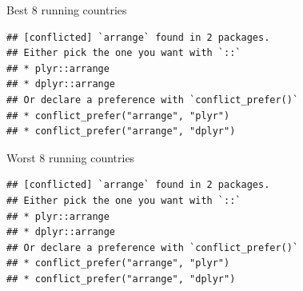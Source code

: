 \documentclass[ignorenonframetext,]{beamer}
\newenvironment{Shaded}{\begin{snugshade}}{\end{snugshade}}
\newcommand{\DataTypeTok}[1]{\textcolor[rgb]{0.13,0.29,0.53}{#1}}
\newcommand{\DecValTok}[1]{\textcolor[rgb]{0.00,0.00,0.81}{#1}}
\newcommand{\FloatTok}[1]{\textcolor[rgb]{0.00,0.00,0.81}{#1}}
\newcommand{\KeywordTok}[1]{\textcolor[rgb]{0.13,0.29,0.53}{\textbf{#1}}}
\newcommand{\NormalTok}[1]{#1}
\newcommand{\OperatorTok}[1]{\textcolor[rgb]{0.81,0.36,0.00}{\textbf{#1}}}
\newcommand{\StringTok}[1]{\textcolor[rgb]{0.31,0.60,0.02}{#1}}
\begin{document}
\begin{frame}[fragile]{Best 8 running countries}
\protect\hypertarget{best-8-running-countries}{}

\begin{Shaded}
\end{Shaded}

\begin{verbatim}
## [conflicted] `arrange` found in 2 packages.
## Either pick the one you want with `::` 
## * plyr::arrange
## * dplyr::arrange
## Or declare a preference with `conflict_prefer()`
## * conflict_prefer("arrange", "plyr")
## * conflict_prefer("arrange", "dplyr")
\end{verbatim}

\end{frame}

\begin{frame}[fragile]{Worst 8 running countries}
\protect\hypertarget{worst-8-running-countries}{}

\begin{Shaded}
\end{Shaded}

\begin{verbatim}
## [conflicted] `arrange` found in 2 packages.
## Either pick the one you want with `::` 
## * plyr::arrange
## * dplyr::arrange
## Or declare a preference with `conflict_prefer()`
## * conflict_prefer("arrange", "plyr")
## * conflict_prefer("arrange", "dplyr")
\end{verbatim}

\end{frame}
\end{document}
